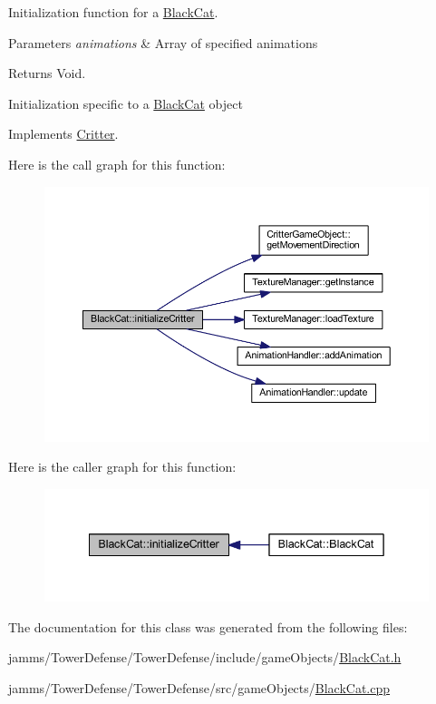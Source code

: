 Initialization function for a \hyperlink{class_black_cat}{Black\+Cat}. 


\begin{DoxyParams}{Parameters}
{\em animations} & Array of specified animations \\
\hline
\end{DoxyParams}
\begin{DoxyReturn}{Returns}
Void.
\end{DoxyReturn}
Initialization specific to a \hyperlink{class_black_cat}{Black\+Cat} object 

Implements \hyperlink{class_critter_ad425da71f01445ee175e5f98d94ca0ba}{Critter}.



Here is the call graph for this function\+:\nopagebreak
\begin{figure}[H]
\begin{center}
\leavevmode
\includegraphics[width=350pt]{class_black_cat_a2ae946e05f754f7d7bdbc753946425eb_cgraph}
\end{center}
\end{figure}




Here is the caller graph for this function\+:\nopagebreak
\begin{figure}[H]
\begin{center}
\leavevmode
\includegraphics[width=342pt]{class_black_cat_a2ae946e05f754f7d7bdbc753946425eb_icgraph}
\end{center}
\end{figure}




The documentation for this class was generated from the following files\+:\begin{DoxyCompactItemize}
\item 
jamms/\+Tower\+Defense/\+Tower\+Defense/include/game\+Objects/\hyperlink{_black_cat_8h}{Black\+Cat.\+h}\item 
jamms/\+Tower\+Defense/\+Tower\+Defense/src/game\+Objects/\hyperlink{_black_cat_8cpp}{Black\+Cat.\+cpp}\end{DoxyCompactItemize}
